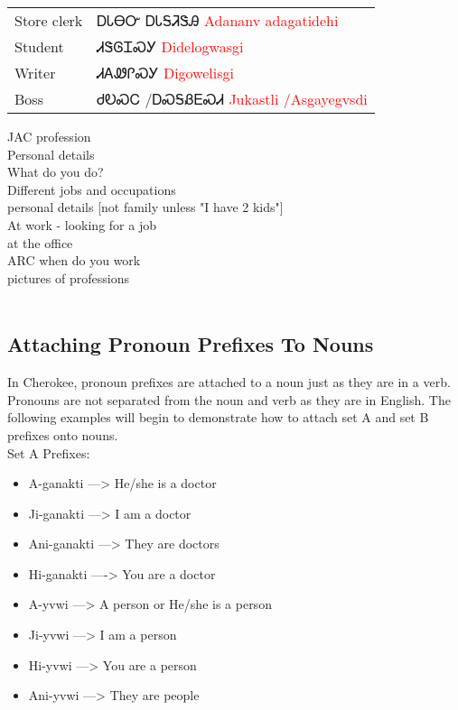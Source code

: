 \vfill\newpage\begin{minipage}{\linewidth}\begin{tabular}{p{3cm} p{11cm}}
Store clerk & ᎠᏓᎾᏅ ᎠᏓᎦᏘᏕᎯ 
 \newline \textcolor{red}{Adananv adagatidehi}\\
Student & ᏗᏕᎶᏆᏍᎩ 
 \newline \textcolor{red}{Didelogwasgi}\\
Writer & ᏗᎪᏪᎵᏍᎩ 
 \newline \textcolor{red}{Digowelisgi}\\
Boss & ᏧᎧᏍᏟ /ᎠᏍᎦᏰᎬᏍᏗ 
 \newline \textcolor{red}{Jukastli /Asgayegvsdi}\\
\end{tabular}
\end{minipage}

\noindent JAC profession\\
Personal details\\
What do you do?\\
Different jobs and occupations\\
personal details [not family unless "I have 2 kids"]\\
At work - looking for a job\\
at the office\\
ARC when do you work\\
pictures of professions\\
\
\subsection{Attaching Pronoun Prefixes To Nouns}
In Cherokee, pronoun prefixes are attached to a noun just as they are in a verb. Pronouns are not separated from the noun and verb as they are in English. The following examples will begin to demonstrate how to attach set A and set B prefixes onto nouns.\cite{walcpp53}\\
\newline \noindent Set A Prefixes:\begin{itemize}
\item A-ganakti —> He/she is a doctor
\item Ji-ganakti —> I am a doctor
\item Ani-ganakti —> They are doctors
\item Hi-ganakti —-> You are a doctor
\item A-yvwi —> A person or He/she is a person
\item Ji-yvwi —> I am a person
\item Hi-yvwi —> You are a person
\item Ani-yvwi —> They are people
\end{itemize}

